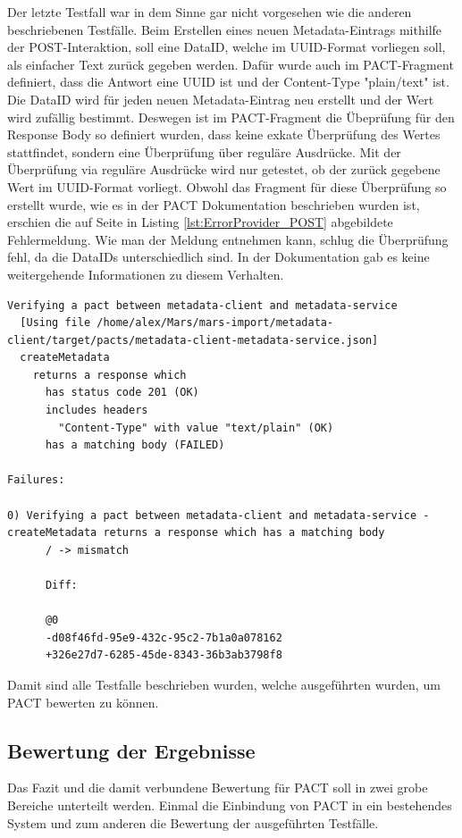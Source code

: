 \documentclass{llncs}
\begin{document}
Der letzte Testfall war in dem Sinne gar nicht vorgesehen wie die anderen beschriebenen Testfälle. Beim Erstellen eines neuen Metadata-Eintrags mithilfe der POST-Interaktion, soll eine DataID, welche im UUID-Format vorliegen soll, als einfacher Text zurück gegeben werden. Dafür wurde auch im PACT-Fragment definiert, dass die Antwort eine UUID ist und der Content-Type "plain/text" ist. Die DataID wird für jeden neuen Metadata-Eintrag neu erstellt und der Wert wird zufällig bestimmt. Deswegen ist im PACT-Fragment die Übeprüfung für den Response Body so definiert wurden, dass keine exkate Überprüfung des Wertes stattfindet, sondern eine Überprüfung über reguläre Ausdrücke.  Mit der Überprüfung via reguläre Ausdrücke wird nur getestet, ob der zurück gegebene Wert im UUID-Format vorliegt. Obwohl das Fragment  für diese Überprüfung so erstellt wurde, wie es in der PACT Dokumentation beschrieben wurden ist, erschien die auf Seite \pageref{lst:ErrorProvider_POST} in Listing \ref{lst:ErrorProvider_POST} abgebildete Fehlermeldung. Wie man der Meldung entnehmen kann, schlug die Überprüfung fehl, da die DataIDs unterschiedlich sind. In der Dokumentation gab es keine weitergehende Informationen zu diesem Verhalten.

\begin{lstlisting}[caption=Test,label={lst:ErrorProvider_POST}]
Verifying a pact between metadata-client and metadata-service
  [Using file /home/alex/Mars/mars-import/metadata-client/target/pacts/metadata-client-metadata-service.json]
  createMetadata
    returns a response which
      has status code 201 (OK)
      includes headers
        "Content-Type" with value "text/plain" (OK)
      has a matching body (FAILED)

Failures:

0) Verifying a pact between metadata-client and metadata-service - createMetadata returns a response which has a matching body
      / -> mismatch

      Diff:

      @0
      -d08f46fd-95e9-432c-95c2-7b1a0a078162
      +326e27d7-6285-45de-8343-36b3ab3798f8
\end{lstlisting}

Damit sind alle Testfalle beschrieben wurden, welche ausgeführten wurden, um PACT bewerten zu können.

\subsection{Bewertung der Ergebnisse}
Das Fazit und die damit verbundene Bewertung für PACT soll in zwei grobe Bereiche unterteilt werden. Einmal die Einbindung von PACT in ein bestehendes System und zum anderen die Bewertung der ausgeführten Testfälle.
\end{document}
